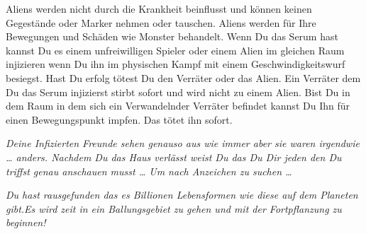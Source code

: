 
\newpage
{}

    \begin{itemize}
        \bitem Aliens werden nicht durch die Krankheit beinflusst und können keinen Gegestände oder Marker nehmen oder tauschen.
        \bitem Aliens werden für Ihre Bewegungen und Schäden wie Monster behandelt.
        \bitem Wenn Du das Serum hast kannst Du es einem unfreiwilligen Spieler oder einem Alien im gleichen Raum injizieren wenn Du ihn im physischen Kampf mit einem Geschwindigkeitswurf besiegst.
Hast Du erfolg tötest Du den Verräter oder das Alien.
        \bitem Ein Verräter dem Du das Serum injizierst stirbt sofort und wird nicht zu einem Alien.
        \bitem Bist Du in dem Raum in dem sich ein Verwandelnder Verräter befindet kannst Du Ihn für einen Bewegungspunkt impfen. Das tötet ihn sofort.
    \end{itemize}


{\itshape Deine Infizierten Freunde sehen genauso aus wie immer aber sie waren irgendwie … anders.
Nachdem Du das Haus verlässt weist Du das Du Dir jeden den Du triffst genau anschauen musst … Um nach Anzeichen zu suchen …
}

{\itshape Du hast rausgefunden das es Billionen Lebensformen wie diese auf dem Planeten gibt.Es wird zeit in ein Ballungsgebiet zu gehen und mit der Fortpflanzung zu beginnen!}